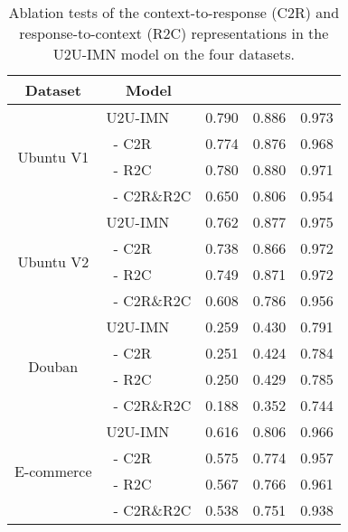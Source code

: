 \documentclass[journal]{IEEEtran}
\begin{document}
    \begin{table}[!hbt]
    \small
    \caption{Ablation tests of the context-to-response (C2R) and response-to-context (R2C) representations in the U2U-IMN model on the four datasets.}
    \centering
    \begin{tabular}{c|l|c|c|c}
    \toprule
     Dataset                    & \multicolumn{1}{c|}{Model} &  &  &   \\
    \hline
    \multirow{4}{*}{Ubuntu V1}  & U2U-IMN                & 0.790 & 0.886 & 0.973  \\
                                & \ - C2R                & 0.774 & 0.876 & 0.968  \\
                                & \ - R2C                & 0.780 & 0.880 & 0.971  \\
                                & \ - C2R\&R2C           & 0.650 & 0.806 & 0.954  \\
    \hline
    \multirow{4}{*}{Ubuntu V2}  & U2U-IMN                & 0.762 & 0.877 & 0.975  \\
                                & \ - C2R                & 0.738 & 0.866 & 0.972  \\
                                & \ - R2C                & 0.749 & 0.871 & 0.972  \\
                                & \ - C2R\&R2C           & 0.608 & 0.786 & 0.956  \\
    \hline
    \multirow{4}{*}{Douban}     & U2U-IMN                & 0.259 & 0.430 & 0.791  \\
                                & \ - C2R                & 0.251 & 0.424 & 0.784  \\
                                & \ - R2C                & 0.250 & 0.429 & 0.785  \\
                                & \ - C2R\&R2C           & 0.188 & 0.352 & 0.744  \\
    \hline
    \multirow{4}{*}{E-commerce} & U2U-IMN                & 0.616 & 0.806 & 0.966  \\
                                & \ - C2R                & 0.575 & 0.774 & 0.957  \\
                                & \ - R2C                & 0.567 & 0.766 & 0.961  \\
                                & \ - C2R\&R2C           & 0.538 & 0.751 & 0.938  \\
    \bottomrule
    \end{tabular}
    \label{tab7}
    \end{table}
\end{document}
